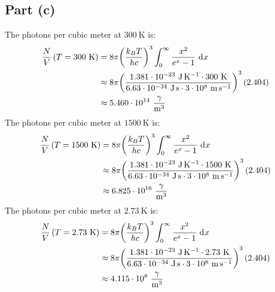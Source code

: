 \documentclass{article}
\begin{document}
\subsection*{Part (c)}
The photons per cubic meter at $300~\unit{\kelvin}$ is:
\begin{equation}
    \begin{split}
        \frac{N}{V}\left(T = 300~\unit{\kelvin}\right) & = 8\pi {\left(\frac{k_BT}{hc}\right)}^3\int_0^{\infty} \frac{x^2}{e^x - 1} \, \diff{x} \\
        & \approx 8\pi {\left(\frac{1.381 \cdot 10^{-23}~\unit{\joule\per\kelvin} \cdot 300~\unit{\kelvin}}{6.63 \cdot 10^{-34}~\unit{\joule\second} \cdot 3 \cdot 10^8~\unit{\meter\per\second}}\right)}^3\left(2.404\right) \\
        & \approx 5.460 \cdot 10^{14}~\unit{\frac{\gamma}{\meter\cubed}}  \\
    \end{split}
\end{equation}
The photons per cubic meter at $1500~\unit{\kelvin}$ is:
\begin{equation}
    \begin{split}
        \frac{N}{V}\left(T = 1500~\unit{\kelvin}\right) & = 8\pi {\left(\frac{k_BT}{hc}\right)}^3\int_0^{\infty} \frac{x^2}{e^x - 1} \, \diff{x} \\
        & \approx 8\pi {\left(\frac{1.381 \cdot 10^{-23}~\unit{\joule\per\kelvin} \cdot 1500~\unit{\kelvin}}{6.63 \cdot 10^{-34}~\unit{\joule\second} \cdot 3 \cdot 10^8~\unit{\meter\per\second}}\right)}^3\left(2.404\right) \\
        & \approx 6.825 \cdot 10^{16}~\unit{\frac{\gamma}{\meter\cubed}}  \\
    \end{split}
\end{equation}
The photons per cubic meter at $2.73~\unit{\kelvin}$ is:
\begin{equation}
    \begin{split}
        \frac{N}{V}\left(T = 2.73~\unit{\kelvin}\right) & = 8\pi {\left(\frac{k_BT}{hc}\right)}^3\int_0^{\infty} \frac{x^2}{e^x - 1} \, \diff{x} \\
        & \approx 8\pi {\left(\frac{1.381 \cdot 10^{-23}~\unit{\joule\per\kelvin} \cdot 2.73~\unit{\kelvin}}{6.63 \cdot 10^{-34}~\unit{\joule\second} \cdot 3 \cdot 10^8~\unit{\meter\per\second}}\right)}^3\left(2.404\right) \\
        & \approx 4.115 \cdot 10^{8}~\unit{\frac{\gamma}{\meter\cubed}}  \\
    \end{split}
\end{equation}
\end{document}
